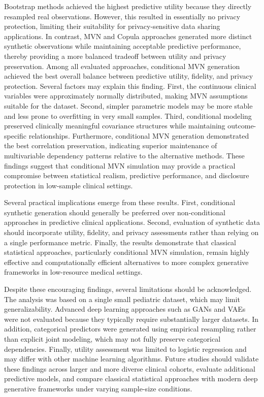 \documentclass[twoside]{article}
\begin{document}
\noindent Bootstrap methods achieved the highest predictive utility because they directly resampled real observations. However, this resulted in essentially no privacy protection, limiting their suitability for privacy-sensitive data sharing applications. In contrast, MVN and Copula approaches generated more distinct synthetic observations while maintaining acceptable predictive performance, thereby providing a more balanced tradeoff between utility and privacy preservation.
\noindent Among all evaluated approaches, conditional MVN generation achieved the best overall balance between predictive utility, fidelity, and privacy protection. Several factors may explain this finding. First, the continuous clinical variables were approximately normally distributed, making MVN assumptions suitable for the dataset. Second, simpler parametric models may be more stable and less prone to overfitting in very small samples. Third, conditional modeling preserved clinically meaningful covariance structures while maintaining outcome-specific relationships. 
\noindent Furthermore, conditional MVN generation demonstrated the best correlation preservation, indicating superior maintenance of multivariable dependency patterns relative to the alternative methods. These findings suggest that conditional MVN simulation may provide a practical compromise between statistical realism, predictive performance, and disclosure protection in low-sample clinical settings.

\noindent Several practical implications emerge from these results. First, conditional synthetic generation should generally be preferred over non-conditional approaches in predictive clinical applications. Second, evaluation of synthetic data should incorporate utility, fidelity, and privacy assessments rather than relying on a single performance metric. Finally, the results demonstrate that classical statistical approaches, particularly conditional MVN simulation, remain highly effective and computationally efficient alternatives to more complex generative frameworks in low-resource medical settings.

\noindent Despite these encouraging findings, several limitations should be acknowledged. The analysis was based on a single small pediatric dataset, which may limit generalizability. Advanced deep learning approaches such as GANs and VAEs were not evaluated because they typically require substantially larger datasets. In addition, categorical predictors were generated using empirical resampling rather than explicit joint modeling, which may not fully preserve categorical dependencies. Finally, utility assessment was limited to logistic regression and may differ with other machine learning algorithms.
\noindent Future studies should validate these findings across larger and more diverse clinical cohorts, evaluate additional predictive models, and compare classical statistical approaches with modern deep generative frameworks under varying sample-size conditions.
\end{document}
